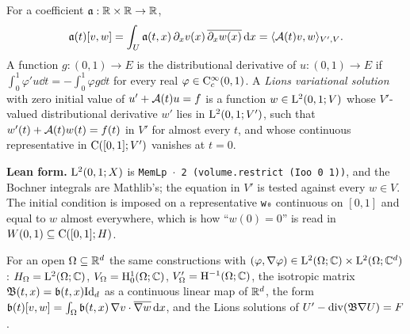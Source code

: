 \begin{definition}
  \label{def:lions-solution}
  \leanok
  For a coefficient $\mathfrak{a}:\mathbb{R}\times\mathbb{R}\to\mathbb{R}$,
  \[
    \mathfrak{a}(t)[v,w]=\int_U\mathfrak{a}(t,x)\,\partial_xv(x)\,\overline{\partial_xw(x)}\,\mathrm{d} x
    =\langle\mathcal{A}(t)v,w\rangle_{V',V}.
  \]
  A function $g:(0,1)\to E$ is the distributional derivative of $u:(0,1)\to E$ if
  $\int_0^1\varphi'u\dd t=-\int_0^1\varphi g\dd t$ for every real $\varphi\in\mathrm{C}_c^\infty(0,1)$.
  A \emph{Lions variational solution} with zero initial value of $u'+\mathcal{A}(t)u=f$ is a function
  $w\in\mathrm{L}^2(0,1;V)$ whose $V'$-valued distributional derivative $w'$ lies in
  $\mathrm{L}^2(0,1;V')$, such that $w'(t)+\mathcal{A}(t)w(t)=f(t)$ in $V'$ for almost every $t$, and whose
  continuous representative in $\mathrm{C}([0,1];V')$ vanishes at $t=0$.
\end{definition}

\textbf{Lean form.}  $\mathrm{L}^2(0,1;X)$ is \texttt{MemLp $\cdot$ 2 (volume.restrict (Ioo 0 1))},
and the Bochner integrals are Mathlib's; the equation in $V'$ is tested against every $w\in V$.
The initial condition is imposed on a representative \texttt{w₀} continuous on $[0,1]$ and equal
to $w$ almost everywhere, which is how ``$w(0)=0$'' is read in $W(0,1)\subseteq\mathrm{C}([0,1];H)$.

\begin{definition}
  \label{def:spaces-domain}
  \leanok
  For an open $\Omega\subseteq\mathbb{R}^d$ the same constructions with
  $(\varphi,\nabla\varphi)\in\mathrm{L}^2(\Omega;\mathbb{C})\times\mathrm{L}^2(\Omega;\mathbb{C}^d)$:
  $H_\Omega=\mathrm{L}^2(\Omega;\mathbb{C})$, $V_\Omega=\mathrm{H}_0^1(\Omega;\mathbb{C})$, $V_\Omega'=\mathrm{H}^{-1}(\Omega;\mathbb{C})$, the
  isotropic matrix $\mathfrak{B}(t,x)=\mathfrak{b}(t,x)\mathrm{Id}_d$ as a continuous linear map of $\mathbb{R}^d$, the form
  $\mathfrak{b}(t)[v,w]=\int_\Omega\mathfrak{b}(t,x)\,\nabla v\cdot\overline{\nabla w}\,\mathrm{d} x$, and the Lions
  solutions of $U'-\operatorname{div}(\mathfrak{B}\nabla U)=F$.
\end{definition}


